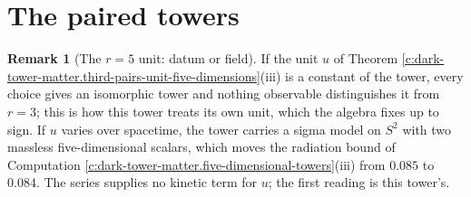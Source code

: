 \documentclass[11pt]{article}
\theoremstyle{definition}
\newtheorem{remark}[theorem]{Remark}
\theoremstyle{plain}
\begin{document}
\section{The paired towers}

\begin{remark}[The $r = 5$ unit: datum or field]\label{c:note.dark-tower-matter.r-5-unit-datum-or-field}
If the unit $u$ of Theorem \ref{c:dark-tower-matter.third-pairs-unit-five-dimensions}(iii) is a constant of the tower, every choice gives an isomorphic tower and nothing observable distinguishes it from $r = 3$; this is how this tower treats its own unit, which the algebra fixes up to sign. If $u$ varies over spacetime, the tower carries a sigma model on $S^{2}$ with two massless five-dimensional scalars, which moves the radiation bound of Computation \ref{c:dark-tower-matter.five-dimensional-towers}(iii) from $0.085$ to $0.084$. The series supplies no kinetic term for $u$; the first reading is this tower's.
\end{remark}
\end{document}
